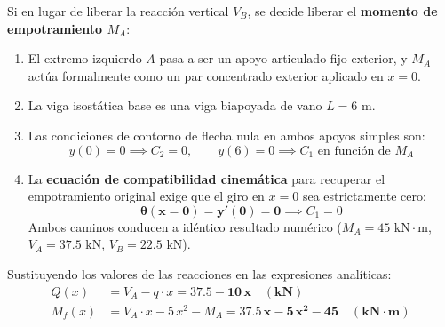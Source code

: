 {    \begin{tcolorbox}[colback=purple!5, colframe=purple!75!black, title=\textbf{Discusión: Planteamiento Alternativo Liberando el Momento $M_A$}]
        Si en lugar de liberar la reacción vertical $V_B$, se decide liberar el \textbf{momento de empotramiento $M_A$}:
        \begin{enumerate}
            \item El extremo izquierdo $A$ pasa a ser un apoyo articulado fijo exterior, y $M_A$ actúa formalmente como un par concentrado exterior aplicado en $x = 0$.
            \item La viga isostática base es una viga biapoyada de vano $L = 6\text{ m}$.
            \item Las condiciones de contorno de flecha nula en ambos apoyos simples son:
                  \begin{equation}
                      y(0) = 0 \implies C_2 = 0, \qquad y(6) = 0 \implies C_1 \text{ en función de } M_A
                  \end{equation}
            \item La \textbf{ecuación de compatibilidad cinemática} para recuperar el empotramiento original exige que el giro en $x = 0$ sea estrictamente cero:
                  \begin{equation}
                      \mathbf{\theta(x = 0) = y'(0) = 0} \implies C_1 = 0
                  \end{equation}
                  Ambos caminos conducen a idéntico resultado numérico ($M_A = 45\text{ kN}\cdot\text{m}$, $V_A = 37.5\text{ kN}$, $V_B = 22.5\text{ kN}$).
        \end{enumerate}
    \end{tcolorbox}


    Sustituyendo los valores de las reacciones en las expresiones analíticas:
    \begin{align}
        Q(x)   & = V_A - q \cdot x = \mathbf{37.5 - 10\,x \quad (\text{kN})}                     \\
        M_f(x) & = V_A \cdot x - 5\,x^2 - M_A = \mathbf{37.5\,x - 5\,x^2 - 45 \quad (\text{kN}\cdot\text{m})}
    \end{align}

}
